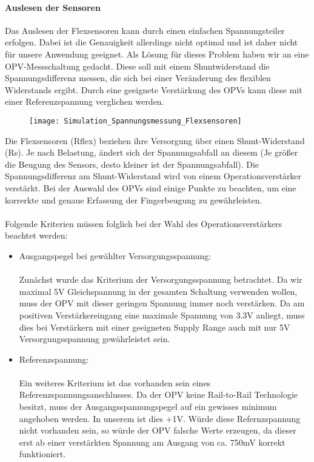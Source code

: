 \documentclass[titlepage,12pt,twoside]{article}
\begin{document}
\paragraph{Auslesen der Sensoren}
\hfill \break
\hfill \break
Das Auslesen der Flexsensoren kann durch einen einfachen Spannungsteiler erfolgen. Dabei ist die Genauigkeit
allerdings nicht optimal und ist daher nicht für unsere Anwendung geeignet. Als Lösung für dieses Problem haben wir an eine 
OPV-Messschaltung gedacht. Diese soll mit einem Shuntwiderstand die Spannungsdifferenz messen, die sich bei einer Veränderung 
des flexiblen Widerstands ergibt. Durch eine geeignete Verstärkung des OPVs kann diese mit einer Referenzspannung verglichen 
werden. \\
\begin{figure}[H]
	\begin{center}
		\scalebox{1.25}
		{\texttt{[image: Simulation\_Spannungsmessung\_Flexsensoren]}}
	\end{center}
\end{figure}
\hfill \break
Die Flexsensoren (Rflex) beziehen ihre Versorgung über einen Shunt-Widerstand (Rs). Je nach Belastung, ändert sich der 
Spannungsabfall an diesem (Je größer die Beugung des Sensors, desto kleiner ist der Spannungsabfall). Die Spannungsdifferenz 
am Shunt-Widerstand wird von einem Operationsverstärker verstärkt. Bei der Auswahl des OPVs sind einige Punkte zu beachten, um 
eine korrerkte und genaue Erfassung der Fingerbeugung zu gewährleisten. \\
\\
Folgende Kriterien müssen folglich bei der Wahl des Operationsverstärkers beachtet werden:
\begin{itemize}
	\item Ausgangspegel bei gewählter Versorgungsspannung: \\
		  \\
		  Zunächst wurde das Kriterium der Versorgungsspannung betrachtet. Da wir maximal 5V Gleichspannung in der gesamten 
		  Schaltung verwenden wollen, muss der OPV mit dieser geringen Spannung immer noch verstärken. Da am positiven 
		  Verstärkereingang eine maximale Spannung von 3.3V anliegt, muss dies bei Verstärkern mit einer geeigneten Supply Range 
		  auch mit nur 5V Versorgungsspannung gewährleistet sein.
	\item Referenzspannung: \\
		  \\
		  Ein weiteres Kriterium ist das vorhanden sein eines Referenzspannungsanschlusses. Da der OPV keine Rail-to-Rail 
		  Technologie besitzt, muss der Ausgangsspannungspegel auf ein gewisses minimum angehoben werden. In unserem ist dies 
		  +1V. Würde diese Refernzspannung nicht vorhanden sein, so würde der OPV falsche Werte erzeugen, da dieser erst ab einer
		  verstärkten Spannung am Ausgang von ca. 750mV korrekt funktioniert.

\end{itemize}
\end{document}
